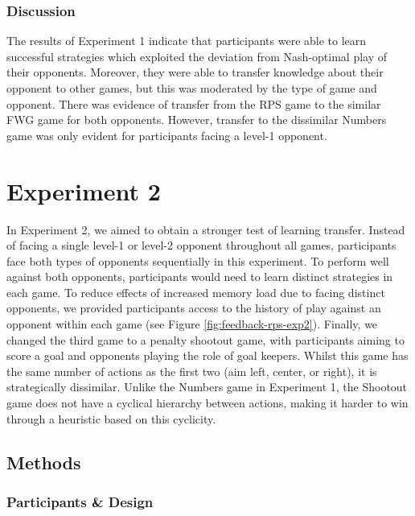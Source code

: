 \documentclass[
  english,
  man,floatsintext]{apa6}
\begin{document}
\hypertarget{discussion}{%
\subsubsection{Discussion}\label{discussion}}

The results of Experiment 1 indicate that participants were able to learn successful strategies which exploited the deviation from Nash-optimal play of their opponents. Moreover, they were able to transfer knowledge about their opponent to other games, but this was moderated by the type of game and opponent. There was evidence of transfer from the RPS game to the similar FWG game for both opponents. However, transfer to the dissimilar Numbers game was only evident for participants facing a level-1 opponent.

\hypertarget{experiment-2}{%
\section{Experiment 2}\label{experiment-2}}

In Experiment 2, we aimed to obtain a stronger test of learning transfer. Instead of facing a single level-1 or level-2 opponent throughout all games, participants face both types of opponents sequentially in this experiment. To perform well against both opponents, participants would need to learn distinct strategies in each game. To reduce effects of increased memory load due to facing distinct opponents, we provided participants access to the history of play against an opponent within each game (see Figure \ref{fig:feedback-rps-exp2}). Finally, we changed the third game to a penalty shootout game, with participants aiming to score a goal and opponents playing the role of goal keepers. Whilst this game has the same number of actions as the first two (aim left, center, or right), it is strategically dissimilar. Unlike the Numbers game in Experiment 1, the Shootout game does not have a cyclical hierarchy between actions, making it harder to win through a heuristic based on this cyclicity.

\hypertarget{methods-1}{%
\subsection{Methods}\label{methods-1}}

\hypertarget{participants-design}{%
\subsubsection{Participants \& Design}\label{participants-design}}
\end{document}
